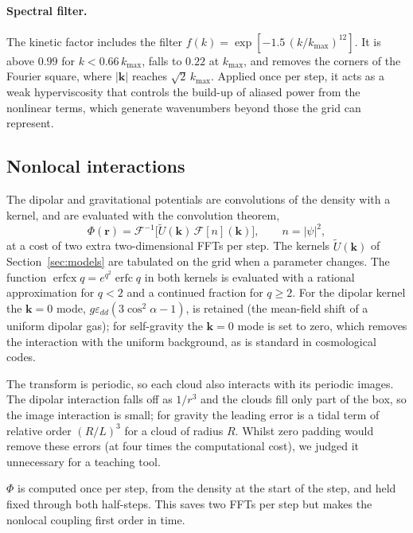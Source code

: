 \documentclass[11pt,a4paper]{article}
\begin{document}
\paragraph{Spectral filter.} The kinetic factor includes the filter $f(k)=\exp[-1.5\,(k/k_{\max})^{12}]$. It is above $0.99$ for $k<0.66\,k_{\max}$, falls to $0.22$ at $k_{\max}$, and removes the corners of the Fourier square, where $|\mathbf k|$ reaches $\sqrt2\,k_{\max}$. Applied once per step, it acts as a weak hyperviscosity that controls the build-up of aliased power from the nonlinear terms, which generate wavenumbers beyond those the grid can represent.

\subsection{Nonlocal interactions}

The dipolar and gravitational potentials are convolutions of the density with a kernel, and are evaluated with the convolution theorem,
\begin{equation}
\Phi(\mathbf r)=\mathcal F^{-1}\bigl[\tilde U(\mathbf k)\,\mathcal F[n](\mathbf k)\bigr],\qquad n=|\psi|^2,
\end{equation}
at a cost of two extra two-dimensional FFTs per step. The kernels $\tilde U(\mathbf k)$ of Section~\ref{sec:models} are tabulated on the grid when a parameter changes. The function $\operatorname{erfcx}q=e^{q^2}\operatorname{erfc}q$ in both kernels is evaluated with a rational approximation for $q<2$ and a continued fraction for $q\ge2$. For the dipolar kernel the $\mathbf k=0$ mode, $g\varepsilon_{dd}(3\cos^2\alpha-1)$, is retained (the mean-field shift of a uniform dipolar gas); for self-gravity the $\mathbf k=0$ mode is set to zero, which removes the interaction with the uniform background, as is standard in cosmological codes.

The transform is periodic, so each cloud also interacts with its periodic images. The dipolar interaction falls off as $1/r^3$ and the clouds fill only part of the box, so the image interaction is small; for gravity the leading error is a tidal term of relative order $(R/L)^3$ for a cloud of radius $R$. Whilst zero padding would remove these errors (at four times the computational cost), we judged it unnecessary for a teaching tool.

$\Phi$ is computed once per step, from the density at the start of the step, and held fixed through both half-steps. This saves two FFTs per step but makes the nonlocal coupling first order in time.
\end{document}
